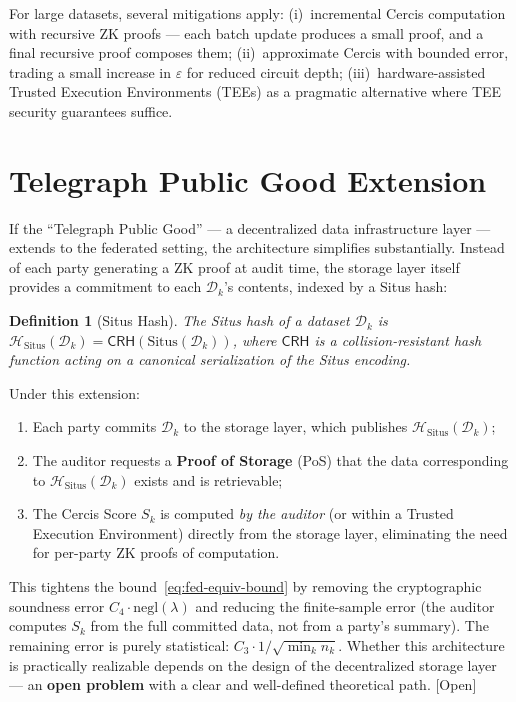 \documentclass[12pt,a4paper]{article}
\newtheorem{definition}[theorem]{Definition}
\newcommand{\openquest}{\textcolor{red!70!black}{\small\textsf{[Open]}}}
\newcommand{\cD}{\mathcal{D}}
\newcommand{\Situs}{\mathrm{Situs}}
\newcommand{\ZK}{\mathrm{ZK}}
\begin{document}
For large datasets, several mitigations apply: (i)~incremental Cercis
computation with recursive $\ZK$ proofs — each batch update produces a small
proof, and a final recursive proof composes them; (ii)~approximate Cercis
with bounded error, trading a small increase in $\varepsilon$ for reduced
circuit depth; (iii)~hardware-assisted Trusted Execution Environments (TEEs)
as a pragmatic alternative where TEE security guarantees suffice.

\section{Telegraph Public Good Extension}
\label{sec:telegraph}

If the ``Telegraph Public Good'' — a decentralized data infrastructure
layer — extends to the federated setting, the architecture simplifies
substantially.  Instead of each party generating a $\ZK$ proof at audit
time, the storage layer itself provides a commitment to each $\cD_k$'s
contents, indexed by a Situs hash:

\begin{definition}[Situs Hash]
The Situs hash of a dataset $\cD_k$ is
$\mathcal{H}_{\Situs}(\cD_k) = \mathsf{CRH}(\Situs(\cD_k))$, where
$\mathsf{CRH}$ is a collision-resistant hash function acting on a
canonical serialization of the Situs encoding.
\end{definition}

Under this extension:
\begin{enumerate}[label=(\roman*)]
    \item Each party commits $\cD_k$ to the storage layer, which publishes
          $\mathcal{H}_{\Situs}(\cD_k)$;
    \item The auditor requests a \textbf{Proof of Storage} (PoS) that the
          data corresponding to $\mathcal{H}_{\Situs}(\cD_k)$ exists and is
          retrievable;
    \item The Cercis Score $S_k$ is computed \emph{by the auditor} (or within
          a Trusted Execution Environment) directly from the storage layer,
          eliminating the need for per-party $\ZK$ proofs of computation.
\end{enumerate}

This tightens the bound~\eqref{eq:fed-equiv-bound} by removing the
cryptographic soundness error $C_4 \cdot \mathrm{negl}(\lambda)$ and
reducing the finite-sample error (the auditor computes $S_k$ from the full
committed data, not from a party's summary).  The remaining error is purely
statistical: $C_3 \cdot 1/\sqrt{\min_k n_k}$.  Whether this architecture is
practically realizable depends on the design of the decentralized storage
layer — an \textbf{open problem} with a clear and well-defined theoretical
path.  \openquest
\end{document}
